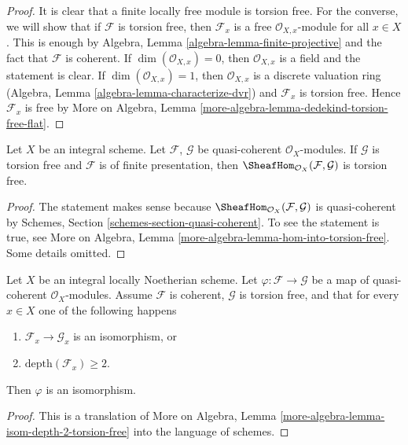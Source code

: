 \begin{proof}
It is clear that a finite locally free module is torsion free.
For the converse, we will show that if $\mathcal{F}$ is
torsion free, then $\mathcal{F}_x$ is a free $\mathcal{O}_{X, x}$-module
for all $x \in X$. This is enough by
Algebra, Lemma \ref{algebra-lemma-finite-projective}
and the fact that $\mathcal{F}$ is coherent.
If $\dim(\mathcal{O}_{X, x}) = 0$, then
$\mathcal{O}_{X, x}$ is a field and the statement is clear.
If $\dim(\mathcal{O}_{X, x}) = 1$, then $\mathcal{O}_{X, x}$
is a discrete valuation ring
(Algebra, Lemma \ref{algebra-lemma-characterize-dvr})
and $\mathcal{F}_x$ is torsion free.
Hence $\mathcal{F}_x$ is free by More on Algebra, Lemma
\ref{more-algebra-lemma-dedekind-torsion-free-flat}.
\end{proof}

\begin{lemma}
\label{lemma-hom-into-torsion-free}
Let $X$ be an integral scheme. Let $\mathcal{F}$, $\mathcal{G}$ be
quasi-coherent $\mathcal{O}_X$-modules.
If $\mathcal{G}$ is torsion free and $\mathcal{F}$ is of finite presentation,
then $\SheafHom_{\mathcal{O}_X}(\mathcal{F}, \mathcal{G})$ is torsion free.
\end{lemma}

\begin{proof}
The statement makes sense because
$\SheafHom_{\mathcal{O}_X}(\mathcal{F}, \mathcal{G})$
is quasi-coherent by Schemes, Section \ref{schemes-section-quasi-coherent}.
To see the statement is true, see
More on Algebra, Lemma \ref{more-algebra-lemma-hom-into-torsion-free}.
Some details omitted.
\end{proof}

\begin{lemma}
\label{lemma-isom-depth-2-torsion-free}
Let $X$ be an integral locally Noetherian scheme. Let
$\varphi : \mathcal{F} \to \mathcal{G}$ be a map of
quasi-coherent $\mathcal{O}_X$-modules. Assume $\mathcal{F}$ is coherent,
$\mathcal{G}$ is torsion free, and that for every $x \in X$ one of the
following happens
\begin{enumerate}
\item $\mathcal{F}_x \to \mathcal{G}_x$ is an isomorphism, or
\item $\text{depth}(\mathcal{F}_x) \geq 2$.
\end{enumerate}
Then $\varphi$ is an isomorphism.
\end{lemma}

\begin{proof}
This is a translation of More on Algebra, Lemma
\ref{more-algebra-lemma-isom-depth-2-torsion-free}
into the language of schemes.
\end{proof}








